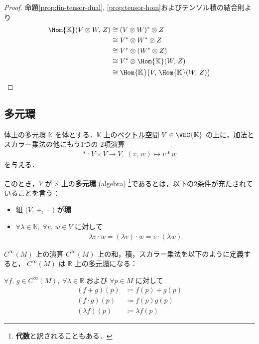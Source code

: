 \documentclass[geometry_main]{subfiles}
\begin{document}
\begin{proof}
    命題\ref{prop:fin-tensor-dual}, \ref{prop:tensor-hom}およびテンソル積の結合則より
    \begin{align}
        \Hom{\mathbb{K}} (V \otimes W,\, Z) 
        &\cong (V \otimes W)^* \otimes Z \\
        &\cong V^* \otimes W^* \otimes Z \\
        &\cong V^* \otimes (W^* \otimes Z) \\
        &\cong V^* \otimes \Hom{\mathbb{K}} (W,\, Z) \\
        &\cong \Hom{\mathbb{K}} \bigl( V,\, \Hom{\mathbb{K}} (W,\, Z) \bigr) 
    \end{align}
\end{proof}


\subsection{多元環}

\begin{myaxiom}[label=ax.alg]{体上の多元環}
	$\mathbb{K}$ を体とする．$\mathbb{K}$ 上の\hyperref[ax.vector]{ベクトル空間} $V \in \VEC{\mathbb{K}}$ の上に，加法とスカラー乗法の他にもう1つの
	2項演算
	\begin{align}
		*\; \colon V \times V \to V,\; (v,\, w) \mapsto v*w
	\end{align}
	を与える．
	
	このとき，$V$ が $\mathbb{K}$ 上の\textbf{多元環} (algebra) \footnote{\textbf{代数}と訳されることもある．}であるとは，以下の2条件が充たされていることを言う：
	\begin{itemize}
		\item 組 $\bigl(V,\, +,\, \cdot \;\bigr)$ が\hyperref[ax:ring]{\textbf{環}}
		\item $\forall \lambda \in \mathbb{K},\; \forall v,\, w \in V$ に対して
		\begin{align}
			\lambda v\cdot w = (\lambda v)\cdot w = v\cdot (\lambda w)
		\end{align}
	\end{itemize}
\end{myaxiom}

\begin{mydef}[label=op_cinfty]{$C^\infty (M)$ 上の演算}
	\hyperref[def.cinfty]{$C^\infty (M)$} 上の和，積，スカラー乗法を以下のように定義すると，
	$C^\infty(M)$ は $\mathbb{R}$ 上の\hyperref[ax.alg]{多元環}になる：

	$\forall f,\, g \in C^\infty (M),\; \forall \lambda \in \mathbb{R}$ および $\forall p \in M$ に対して
	\begin{align}
		(f + g)(p) &\coloneqq f(p) + g(p) \\
		(f\cdot g)(p) &\coloneqq f(p) g(p) \\
		(\lambda f)(p) &\coloneqq \lambda f(p)
	\end{align}
\end{mydef}
\end{document}
